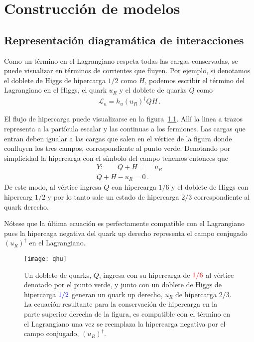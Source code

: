
\chapter{Construcción de modelos}

\section{Representación diagramática de interacciones}

Como un término en el Lagrangiano respeta todas las cargas conservadas,  se puede visualizar en términos de corrientes que fluyen. 
Por ejemplo, si denotamos el doblete de Higgs de hipercarga $1/2$ como
$H$, podemos escribir el término del Lagrangiano en el Higgs, el quark $u_R$ y el doblete de quarks $Q$ como
\begin{align}
  \mathcal{L}_u=h_u \left( u_R \right)^{\dagger} Q H\,. 
\end{align}

El flujo de hipercarga puede visualizarse en la figura~\ref{fig:yg}. Allí la linea a trazos representa a la partícula escalar y las continuas a los fermiones.  Las cargas que entran deben igualar a las cargas que salen en el vértice de la figura donde confluyen los tres campos, correspondiente al punto verde. Denotando por simplicidad la hipercarga con el símbolo del campo tenemos entonces que
\begin{align}
  Y:\qquad Q+H=&u_R \nonumber\\
            Q+H-u_R=0\,.
\end{align}
De este modo, al vértice ingresa $Q$ con hipercarga $1/6$ y el doblete de Higgs con hipercarg $1/2$ y por lo tanto sale un estado de hipercarga $2/3$ correspondiente al quark derecho. 

Nótese que la última ecuación es perfectamente compatible con el Lagrangiano pues la hipercaga negativa del quark up derecho  representa el campo conjugado $\left( u_R \right)^{\dagger}$ en el Lagrangiano.

\begin{figure}
  \centering
  \texttt{[image: qhu]}
  \caption{Un doblete de quarks, $Q$, ingresa con su hipercarga de $\color{red}1/6$ al vértice denotado por el {\color{OliveGreen}punto verde}, y junto con un doblete de Higgs de hipercarga $\color{blue}1/2$ generan un quark up derecho, $u_R$ de hipercarga $2/3$. La ecuación resultante para la conservación de hipercarga en la parte superior derecha de la figura, es compatible con el término en el Lagrangiano una vez se reemplaza la hipercarga negativa por el campo conjugado, $\left( u_R \right)^{\dagger}$. }
  \label{fig:yg}
\end{figure}

